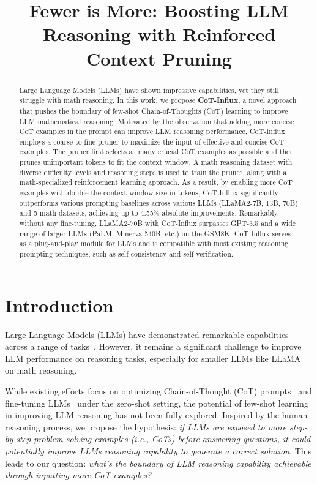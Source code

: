 \title{Fewer is More: Boosting LLM Reasoning with Reinforced Context Pruning}

\begin{abstract}
Large Language Models (LLMs) have shown impressive capabilities, yet they still struggle with math reasoning. In this work, we propose \textbf{CoT-Influx}, a novel approach that pushes the boundary of few-shot Chain-of-Thoughts (CoT) learning to improve LLM mathematical reasoning. Motivated by the observation that adding more concise CoT examples in the prompt can improve LLM reasoning performance, {CoT-Influx} employs a coarse-to-fine pruner to maximize the input of effective and concise CoT examples. The pruner first  selects as many crucial CoT examples as possible and then prunes unimportant tokens to fit the context window. A math reasoning dataset with diverse difficulty levels and reasoning steps is used to train the pruner, along with a math-specialized reinforcement learning approach. As a result, by enabling more CoT examples with double the context window size in tokens, {CoT-Influx} significantly outperforms various prompting baselines  across various LLMs (LLaMA2-7B, 13B, 70B) and 5 math datasets, achieving up to 4.55\% absolute improvements. Remarkably, without any fine-tuning, LLaMA2-70B with {CoT-Influx} surpasses GPT-3.5 and a wide range of larger LLMs (PaLM, Minerva 540B, etc.) on the GSM8K. {CoT-Influx} serves as a plug-and-play module for LLMs and is compatible with most existing reasoning prompting techniques, such as self-consistency and self-verification.
\end{abstract}

\section{Introduction}

Large Language Models (LLMs) have demonstrated remarkable capabilities across a range of tasks~\cite{gpt3,gpt4}. However, it remains a significant challenge to improve LLM performance on reasoning tasks, especially for smaller LLMs like LLaMA~\cite{llama} on math reasoning. 

While existing efforts focus on optimizing Chain-of-Thought (CoT) prompts~\cite{cot, selfconsistency,treeofthought} and fine-tuning LLMs~\cite{luo2023wizardmath} under the zero-shot setting, the potential of few-shot learning in improving LLM reasoning has not been fully explored. Inspired by the human reasoning process, we propose the hypothesis: \textit{if LLMs are exposed to more step-by-step problem-solving examples (i.e., CoTs) before answering questions, it could potentially improve LLMs reasoning capability to generate a correct solution}.  This leads to our question: \textit{what's the boundary of LLM reasoning capability achievable through inputting more CoT examples?}

